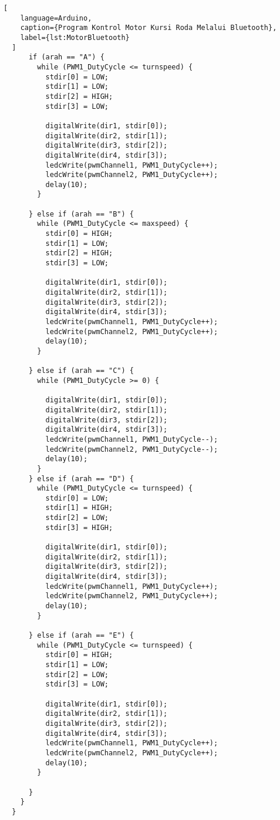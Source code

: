 \begin{lstlisting}[
    language=Arduino,
    caption={Program Kontrol Motor Kursi Roda Melalui Bluetooth},
    label={lst:MotorBluetooth}
  ]
      if (arah == "A") {
        while (PWM1_DutyCycle <= turnspeed) {
          stdir[0] = LOW;
          stdir[1] = LOW;
          stdir[2] = HIGH;
          stdir[3] = LOW;
  
          digitalWrite(dir1, stdir[0]);
          digitalWrite(dir2, stdir[1]);
          digitalWrite(dir3, stdir[2]);
          digitalWrite(dir4, stdir[3]);
          ledcWrite(pwmChannel1, PWM1_DutyCycle++);
          ledcWrite(pwmChannel2, PWM1_DutyCycle++);
          delay(10);
        }
  
      } else if (arah == "B") {
        while (PWM1_DutyCycle <= maxspeed) {
          stdir[0] = HIGH;
          stdir[1] = LOW;
          stdir[2] = HIGH;
          stdir[3] = LOW;
  
          digitalWrite(dir1, stdir[0]);
          digitalWrite(dir2, stdir[1]);
          digitalWrite(dir3, stdir[2]);
          digitalWrite(dir4, stdir[3]);
          ledcWrite(pwmChannel1, PWM1_DutyCycle++);
          ledcWrite(pwmChannel2, PWM1_DutyCycle++);
          delay(10);
        }
  
      } else if (arah == "C") {
        while (PWM1_DutyCycle >= 0) {
  
          digitalWrite(dir1, stdir[0]);
          digitalWrite(dir2, stdir[1]);
          digitalWrite(dir3, stdir[2]);
          digitalWrite(dir4, stdir[3]);
          ledcWrite(pwmChannel1, PWM1_DutyCycle--);
          ledcWrite(pwmChannel2, PWM1_DutyCycle--);
          delay(10);
        }
      } else if (arah == "D") {
        while (PWM1_DutyCycle <= turnspeed) {
          stdir[0] = LOW;
          stdir[1] = HIGH;
          stdir[2] = LOW;
          stdir[3] = HIGH;
  
          digitalWrite(dir1, stdir[0]);
          digitalWrite(dir2, stdir[1]);
          digitalWrite(dir3, stdir[2]);
          digitalWrite(dir4, stdir[3]);
          ledcWrite(pwmChannel1, PWM1_DutyCycle++);
          ledcWrite(pwmChannel2, PWM1_DutyCycle++);
          delay(10);
        }
  
      } else if (arah == "E") {
        while (PWM1_DutyCycle <= turnspeed) {
          stdir[0] = HIGH;
          stdir[1] = LOW;
          stdir[2] = LOW;
          stdir[3] = LOW;
  
          digitalWrite(dir1, stdir[0]);
          digitalWrite(dir2, stdir[1]);
          digitalWrite(dir3, stdir[2]);
          digitalWrite(dir4, stdir[3]);
          ledcWrite(pwmChannel1, PWM1_DutyCycle++);
          ledcWrite(pwmChannel2, PWM1_DutyCycle++);
          delay(10);
        }
  
      }
    }
  }  
  \end{lstlisting}

